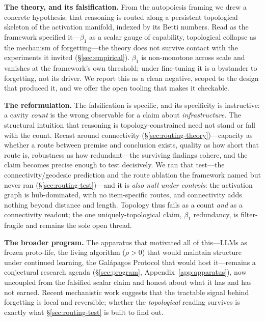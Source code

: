 \documentclass{article}
\begin{document}
\bigskip
\noindent\textbf{The theory, and its falsification.} From the autopoiesis framing we drew a concrete
hypothesis: that reasoning is routed along a persistent topological skeleton of the activation
manifold, indexed by its Betti numbers. Read as the framework specified it---$\beta_1$ as a scalar
gauge of capability, topological collapse as the mechanism of forgetting---the theory does not
survive contact with the experiments it invited (\S\ref{sec:empirical}). $\beta_1$ is non-monotone
across scale and vanishes at the framework's own threshold; under fine-tuning it is a bystander to
forgetting, not its driver. We report this as a clean negative, scoped to the design that produced
it, and we offer the open tooling that makes it checkable.

\bigskip
\noindent\textbf{The reformulation.} The falsification is specific, and its specificity is
instructive: a cavity \emph{count} is the wrong observable for a claim about \emph{infrastructure}.
The structural intuition that reasoning is topology-constrained need not stand or fall with the count.
Recast around connectivity (\S\ref{sec:routing-theory})---capacity as whether a route between premise
and conclusion exists, quality as how short that route is, robustness as how redundant---the surviving
findings cohere, and the claim becomes precise enough to test decisively. We ran that test---the
connectivity/geodesic prediction and the route ablation the framework named but never ran
(\S\ref{sec:routing-test})---and it is \emph{also null under controls}: the activation graph is
hub-dominated, with no item-specific routes, and connectivity adds nothing beyond distance and length.
Topology thus fails as a count \emph{and} as a connectivity readout; the one uniquely-topological
claim, $\beta_1$ redundancy, is filter-fragile and remains the sole open thread.

\bigskip
\noindent\textbf{The broader program.} The apparatus that motivated all of this---LLMs as frozen
proto-life, the living algorithm ($\rho>0$) that would maintain structure under continued learning,
the Gal\'apagos Protocol that would host it---remains a conjectural research agenda
(\S\ref{sec:program}, Appendix~\ref{app:apparatus}), now uncoupled from the falsified scalar claim and
honest about what it has and has not earned. Recent mechanistic work \citep{Yang2026localrl} suggests
that the tractable signal behind forgetting is local and reversible; whether the \emph{topological}
reading survives is exactly what \S\ref{sec:routing-test} is built to find out.
\end{document}
